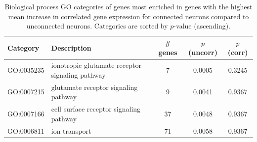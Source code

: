 \documentclass[10pt,letterpaper]{article}
\begin{document}
{\begin{table}[]
\begin{adjustwidth}{-2.25in}{}
\centering
\caption{Biological process GO categories of genes most enriched in genes with the highest mean increase in correlated gene expression for connected neurons compared to unconnected neurons.
Categories are sorted by $p$-value (ascending).}
\label{tab:enrichmentCON}
\begin{tabular}{llccc}

\hline
\textbf{Category} & \textbf{Description} & \textbf{\# genes} & \textbf{$p$ (uncorr)}                                                                                                                                        & \textbf{$p$ (corr)} \\ \hline                                                                                                                                         %
GO:0035235          & ionotropic glutamate receptor signaling pathway & 7                                                      & 0.0005                                                & 0.3245                                             \\
GO:0007215          & glutamate receptor signaling pathway                                                       & 9                                                      & 0.0041                                                & 0.9367                                             \\
GO:0007166          & cell surface receptor signaling pathway                                                    & 37                                                     & 0.0048                                                & 0.9367                                             \\
GO:0006811          & ion transport                                                                              & 71                                                     & 0.0058                                                & 0.9367                                             \\

\end{tabular}
\end{adjustwidth}
\end{table}}
\end{document}
